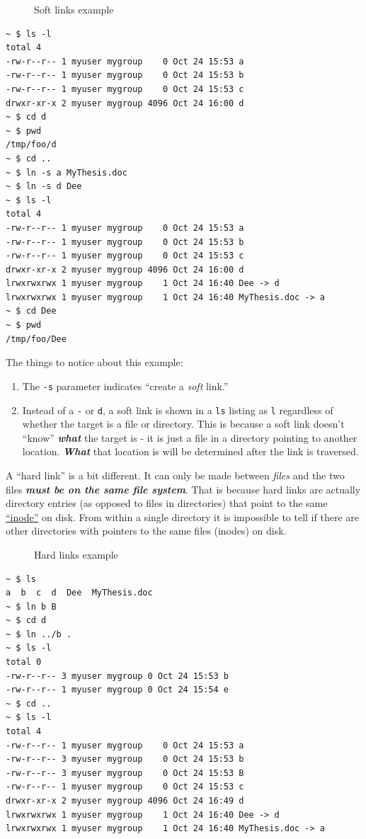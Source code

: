 \documentclass[10pt,]{book}
\numberwithin{figure}{chapter}
\DeclareRobustCommand{\drcap}[1]{\begin{figure}[H]\caption{#1}\end{figure}}
\begin{document}
\drcap{Soft links example}

\begin{verbatim}
~ $ ls -l
total 4
-rw-r--r-- 1 myuser mygroup    0 Oct 24 15:53 a
-rw-r--r-- 1 myuser mygroup    0 Oct 24 15:53 b
-rw-r--r-- 1 myuser mygroup    0 Oct 24 15:53 c
drwxr-xr-x 2 myuser mygroup 4096 Oct 24 16:00 d
~ $ cd d
~ $ pwd
/tmp/foo/d
~ $ cd ..
~ $ ln -s a MyThesis.doc
~ $ ln -s d Dee
~ $ ls -l
total 4
-rw-r--r-- 1 myuser mygroup    0 Oct 24 15:53 a
-rw-r--r-- 1 myuser mygroup    0 Oct 24 15:53 b
-rw-r--r-- 1 myuser mygroup    0 Oct 24 15:53 c
drwxr-xr-x 2 myuser mygroup 4096 Oct 24 16:00 d
lrwxrwxrwx 1 myuser mygroup    1 Oct 24 16:40 Dee -> d
lrwxrwxrwx 1 myuser mygroup    1 Oct 24 16:40 MyThesis.doc -> a
~ $ cd Dee
~ $ pwd
/tmp/foo/Dee
\end{verbatim}

The things to notice about this example:

\begin{enumerate}
\def\labelenumi{\arabic{enumi}.}
\item
  The \texttt{-s} parameter indicates ``create a \emph{soft} link.''
\item
  Instead of a \texttt{-} or \texttt{d}, a soft link is shown in a
  \texttt{ls} listing as \texttt{l} regardless of whether the target is
  a file or directory. This is because a soft link doesn't ``know''
  \textbf{\emph{what}} the target is - it is just a file in a directory
  pointing to another location. \textbf{\emph{What}} that location is
  will be determined after the link is traversed.
\end{enumerate}

A ``hard link'' is a bit different. It can only be made
between \emph{files} and the two files \textbf{\emph{must be on the same
file system}}. That is because hard links are actually directory entries
(as opposed to files in directories) that point to the same
\href{https://en.wikipedia.org/wiki/Inode}{``inode''} on
disk. From within a single directory it is impossible to tell if there
are other directories with pointers to the same files (inodes) on disk.

\drcap{Hard links example}

\begin{verbatim}
~ $ ls
a  b  c  d  Dee  MyThesis.doc
~ $ ln b B
~ $ cd d
~ $ ln ../b .
~ $ ls -l
total 0
-rw-r--r-- 3 myuser mygroup 0 Oct 24 15:53 b
-rw-r--r-- 1 myuser mygroup 0 Oct 24 15:54 e
~ $ cd ..
~ $ ls -l
total 4
-rw-r--r-- 1 myuser mygroup    0 Oct 24 15:53 a
-rw-r--r-- 3 myuser mygroup    0 Oct 24 15:53 b
-rw-r--r-- 3 myuser mygroup    0 Oct 24 15:53 B
-rw-r--r-- 1 myuser mygroup    0 Oct 24 15:53 c
drwxr-xr-x 2 myuser mygroup 4096 Oct 24 16:49 d
lrwxrwxrwx 1 myuser mygroup    1 Oct 24 16:40 Dee -> d
lrwxrwxrwx 1 myuser mygroup    1 Oct 24 16:40 MyThesis.doc -> a
\end{verbatim}
\end{document}
